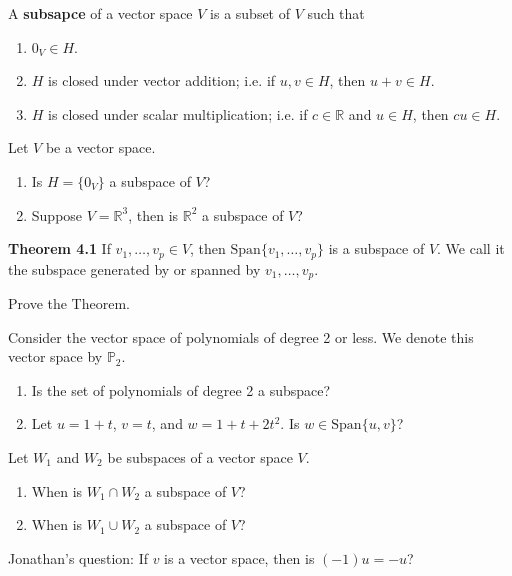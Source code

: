 \documentclass[12pt,letterpaper]{article}
\begin{document}
\begin{enumerate}
\begin{defn}
A {\bf subsapce} of a vector space $V$ is a subset of $V$ such that
\begin{enumerate}
\item $0_V \in H$.
\item $H$ is closed under vector addition; i.e. if $u, v \in H$, then $u+v \in H$.
\item $H$ is closed under scalar multiplication; i.e. if $c \in \mathbb{R}$ and $u \in H$, then $cu \in H$.
\end{enumerate}
\end{defn}

\Problem Let $V$ be a vector space.
\begin{enumerate}
\item Is $H=\{ 0_V \}$ a subspace of $V$?

\vfill

\item Suppose $V=\mathbb{R}^3$, then is $\mathbb{R}^2$ a subspace of $V$?

\vfill

\end{enumerate}

{\bf Theorem 4.1} If $v_1, \dots, v_p \in V$, then $\text{Span}\{v_1 ,\dots, v_p\}$ is a subspace of $V$. We call it the subspace generated by or spanned by $v_1,\dots, v_p$.

\Problem Prove the Theorem.

\vfill

\newpage

\Problem Consider the vector space of polynomials of degree 2 or less. We denote this vector space by $\mathbb{P}_2$.

\begin{enumerate}
\item Is the set of polynomials of degree 2 a subspace?

\vfill

\item Let $u=1+t$, $v=t$, and $w=1+t+2t^2$. Is $w \in \text{Span}\{ u, v\}$?

\vfill

\end{enumerate}

\Problem Let $W_1$ and $W_2$ be subspaces of a vector space $V$. 

\begin{enumerate}
\item When is $W_1 \cap W_2$ a subspace of $V$?

\vfill

\item When is $W_1 \cup W_2$ a subspace of $V$?

\vfill



\end{enumerate}

\Problem Jonathan's question: If $v$ is a vector space, then is $(-1) u= -u$?

\vfill

\end{enumerate}
\end{document}
